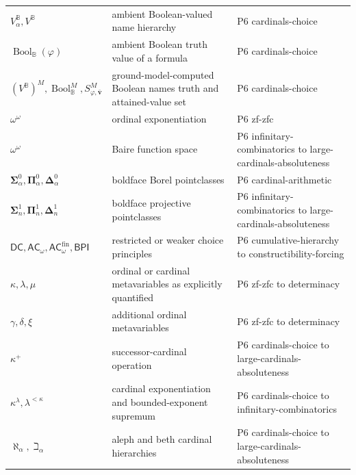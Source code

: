 \begin{longtable}{@{}p{}p{}p{}@{}}
\(V^{\mathbb B}_\alpha,\allowbreak V^{\mathbb B}\) & ambient Boolean-valued name hierarchy & P6 cardinals-\allowbreak{}choice \\
\(\operatorname{Bool}_{\mathbb B}(\varphi)\) & ambient Boolean truth value of a formula & P6 cardinals-\allowbreak{}choice \\
\((V^{\mathbb B})^M,\allowbreak \operatorname{Bool}_{\mathbb B}^M,\allowbreak S_{\varphi,\bar{\mathbf v}}^M\) & ground-model-computed Boolean names truth and attained-value set & P6 cardinals-\allowbreak{}choice \\
\(\omega^\omega\) & ordinal exponentiation & P6 zf-\allowbreak{}zfc \\
\(\omega^\omega\) & Baire function space & P6 infinitary-\allowbreak{}combinatorics to large-\allowbreak{}cardinals-\allowbreak{}absoluteness \\
\(\boldsymbol{\Sigma}^{0}_{\alpha},\allowbreak \boldsymbol{\Pi}^{0}_{\alpha},\allowbreak \boldsymbol{\Delta}^{0}_{\alpha}\) & boldface Borel pointclasses & P6 cardinal-\allowbreak{}arithmetic \\
\(\boldsymbol{\Sigma}^{1}_{n},\allowbreak \boldsymbol{\Pi}^{1}_{n},\allowbreak \boldsymbol{\Delta}^{1}_{n}\) & boldface projective pointclasses & P6 infinitary-\allowbreak{}combinatorics to large-\allowbreak{}cardinals-\allowbreak{}absoluteness \\
\(\mathsf{DC},\allowbreak \mathsf{AC}_{\omega},\allowbreak \mathsf{AC}_{\omega}^{\mathrm{fin}},\allowbreak \mathsf{BPI}\) & restricted or weaker choice principles & P6 cumulative-\allowbreak{}hierarchy to constructibility-\allowbreak{}forcing \\
\(\kappa,\allowbreak \lambda,\allowbreak \mu\) & ordinal or cardinal metavariables as explicitly quantified & P6 zf-\allowbreak{}zfc to determinacy \\
\(\gamma,\allowbreak \delta,\allowbreak \xi\) & additional ordinal metavariables & P6 zf-\allowbreak{}zfc to determinacy \\
\(\kappa^+\) & successor-cardinal operation & P6 cardinals-\allowbreak{}choice to large-\allowbreak{}cardinals-\allowbreak{}absoluteness \\
\(\kappa^\lambda,\allowbreak \lambda^{<\kappa}\) & cardinal exponentiation and bounded-exponent supremum & P6 cardinals-\allowbreak{}choice to infinitary-\allowbreak{}combinatorics \\
\(\aleph_\alpha,\allowbreak \beth_\alpha\) & aleph and beth cardinal hierarchies & P6 cardinals-\allowbreak{}choice to large-\allowbreak{}cardinals-\allowbreak{}absoluteness \\

\end{longtable}
